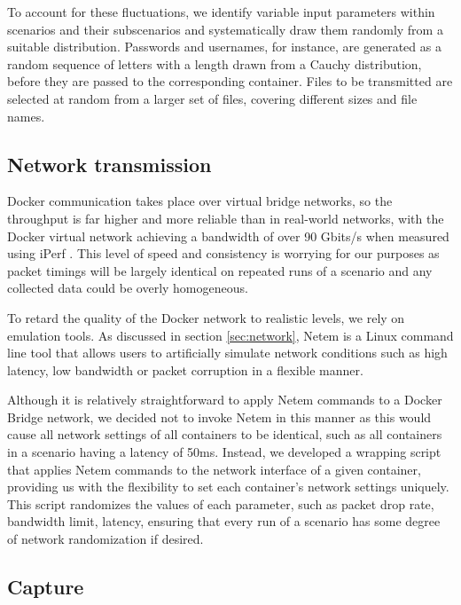 \documentclass[sigconf]{acmart}
\begin{document}
To account for these fluctuations, we identify variable input parameters within scenarios and their subscenarios and systematically draw them randomly from a suitable distribution. Passwords and usernames, for instance, are generated as a random sequence of letters with a length drawn from a Cauchy distribution, before they are passed to the corresponding container. Files to be transmitted are selected at random from a larger set of files, covering different sizes and file names.


\subsection{Network transmission}\label{Sec:Netrand}


 Docker communication takes place over virtual bridge networks, so the throughput is far higher and more reliable than in real-world networks, with the Docker virtual network achieving a bandwidth of over 90 Gbits/s when measured using iPerf \cite{iperf}. This level of speed and consistency is worrying for our purposes as packet timings will be largely identical on repeated runs of a scenario and any collected data could be overly homogeneous.

To retard the quality of the Docker network to realistic levels, we rely on emulation tools. As discussed in section \ref{sec:network}, Netem is a Linux command line tool that allows users to artificially simulate network conditions such as high latency, low bandwidth or packet corruption in a flexible manner.

Although it is relatively straightforward to apply Netem commands to a Docker Bridge network, we decided not to invoke Netem in this manner as this would cause all network settings of all containers to be identical, such as all containers in a scenario having a latency of 50ms.  Instead, we developed a wrapping script that applies Netem commands to the network interface of a given container, providing us with the flexibility to set each container's network settings uniquely. This script randomizes the values of each parameter, such as packet drop rate, bandwidth limit, latency, ensuring that every run of a scenario has some degree of network randomization if desired.

\subsection{Capture}

\end{document}
